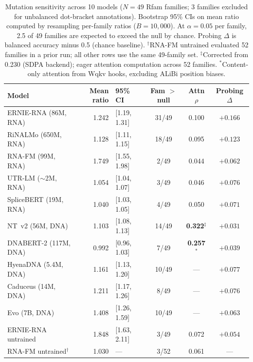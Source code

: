 \documentclass[11pt]{article}
\begin{document}
\begin{table}[htbp]
\centering
\caption{Mutation sensitivity across 10 models ($N = 49$ Rfam families;
3 families excluded for unbalanced dot-bracket annotations).
Bootstrap 95\% CIs on mean ratio computed by resampling per-family
ratios ($B = 10{,}000$). At $\alpha = 0.05$ per family, 2.5 of 49
families are expected to exceed the null by chance.
Probing $\Delta$ is balanced accuracy minus 0.5 (chance baseline).
$^\dagger$RNA-FM untrained evaluated 52 families in a prior run;
all other rows use the same 49-family set.
$^\ddagger$Corrected from 0.230 (SDPA backend); eager attention
computation across 52 families.
$^{*}$Content-only attention from Wqkv hooks, excluding ALiBi
position biases.}
\label{tab:rung1}
\small
\begin{tabular}{lrlccc}
\toprule
\textbf{Model} & \textbf{Mean ratio} & \textbf{95\% CI} & \textbf{Fam $>$ null} & \textbf{Attn $\rho$} & \textbf{Probing $\Delta$} \\
\midrule
ERNIE-RNA (86M, RNA)    & 1.242 & [1.19, 1.31] & 31/49 & 0.100          & $+0.166$ \\
RiNALMo (650M, RNA)     & 1.128 & [1.11, 1.15] & 18/49 & 0.095          & $+0.123$ \\
RNA-FM (99M, RNA)       & 1.749 & [1.55, 1.98] & 2/49  & 0.044          & $+0.062$ \\
UTR-LM ($\sim$2M, RNA)  & 1.054 & [1.04, 1.07] & 3/49  & 0.046          & $+0.076$ \\
SpliceBERT (19M, RNA)   & 1.040 & [1.03, 1.05] & 4/49  & 0.050          & $+0.071$ \\
NT~v2 (56M, DNA)        & 1.103 & [1.08, 1.13] & 14/49 & \textbf{0.322}$^\ddagger$ & $+0.031$ \\
DNABERT-2 (117M, DNA)   & 0.992 & [0.96, 1.03] & 7/49  & \textbf{0.257}$^{*}$ & $+0.039$ \\
HyenaDNA (5.4M, DNA)    & 1.161 & [1.13, 1.20] & 10/49 & ---            & $+0.077$ \\
Caduceus (14M, DNA)     & 1.211 & [1.17, 1.26] & 8/49  & ---            & $+0.076$ \\
Evo (7B, DNA)           & 1.408 & [1.26, 1.59] & 10/49 & ---            & $+0.063$ \\
\midrule
ERNIE-RNA untrained     & 1.848 & [1.63, 2.11] & 3/49  & 0.072          & $+0.054$ \\
RNA-FM untrained$^\dagger$ & 1.030 & ---        & 3/52  & 0.061          & --- \\
\bottomrule
\end{tabular}
\end{table}
\end{document}
